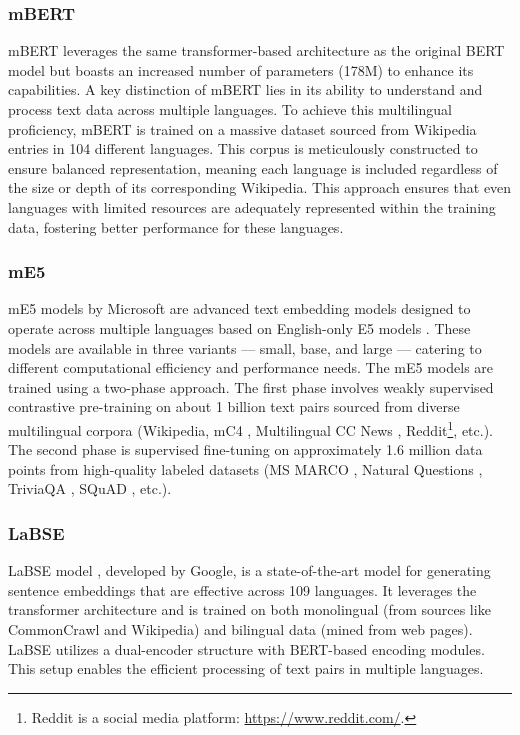 \subsubsection{\ac{mBERT}} \label{model:mbert}
\ac{mBERT} \cite{devlin2019bert} leverages the same transformer-based architecture as the original \ac{BERT} model but boasts an increased number of parameters (178M) to enhance its capabilities.
A key distinction of \ac{mBERT} lies in its ability to understand and process text data across multiple languages.
To achieve this multilingual proficiency, \ac{mBERT} is trained on a massive dataset sourced from Wikipedia entries in 104 different languages.
This corpus is meticulously constructed to ensure balanced representation, meaning each language is included regardless of the size or depth of its corresponding Wikipedia.
This approach ensures that even languages with limited resources are adequately represented within the training data, fostering better performance for these languages.

\subsubsection{\ac{mE5}} \label{model:me5}
\ac{mE5} models by Microsoft \cite{wang2024multilingual} are advanced text embedding models designed to operate across multiple languages based on English-only E5 models \cite{wang2024text}.
These models are available in three variants — small, base, and large — catering to different computational efficiency and performance needs.
The \ac{mE5} models are trained using a two-phase approach.
The first phase involves weakly supervised contrastive pre-training on about 1 billion text pairs sourced from diverse multilingual corpora (Wikipedia, mC4 \cite{xue2021mt5}, Multilingual CC News \cite{commoncrawl}, Reddit\footnote{\label{footnote:reddit}Reddit is a social media platform: \url{https://www.reddit.com/}.}, etc.).
The second phase is supervised fine-tuning on approximately 1.6 million data points from high-quality labeled datasets (MS MARCO \cite{bajaj2018ms}, Natural Questions \cite{kwiatkowski2019natural}, TriviaQA \cite{joshi2017triviaqa}, SQuAD \cite{rajpurkar2016squad}, etc.).

\subsubsection{\ac{LaBSE}} \label{model:labse}
\ac{LaBSE} model \cite{feng2022languageagnostic}, developed by Google, is a state-of-the-art model for generating sentence embeddings that are effective across 109 languages.
It leverages the transformer architecture and is trained on both monolingual (from sources like CommonCrawl \cite{commoncrawl} and Wikipedia) and bilingual data (mined from web pages).
\ac{LaBSE} utilizes a dual-encoder structure with \ac{BERT}-based encoding modules.
This setup enables the efficient processing of text pairs in multiple languages.

